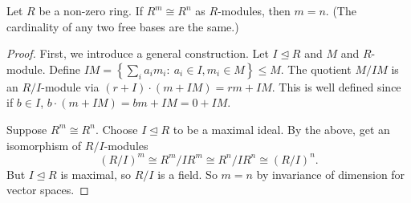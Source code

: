 \documentclass[egregdoesnotlikesansseriftitles,a4paper]{scrartcl}
\begin{document}
\begin{proposition}
        Let $R$ be a non-zero ring. If $R^{m} \cong R^{n}$ as $R$-modules, then $m=n$. (The cardinality of any two free bases are the same.)
\end{proposition}
\begin{proof}
        First, we introduce a general construction. Let $I \unlhd R$ and $M$ and $R$-module. Define $IM = \left\{ \sum_{i}^{}a_{i}m_{i}: \ a_i \in I, m_{i}\in M\right\} \leq M$. The quotient $M/IM$ is an $R/I$-module via $(r+I) \cdot (m+IM) = rm +IM$. This is well defined since if $b \in I$, $b \cdot (m+IM)= bm +IM =0+IM$. 

        Suppose $R^{m} \cong R^{n}$. Choose $I \unlhd R$ to be a maximal ideal\footnotemark. By the above, get an isomorphism of $R/I$-modules \[
        \left(R/I\right)^{m} \cong R^{m}/IR^{m} \cong R^{n}/IR^{n} \cong \left(R/I\right)^{n}
        .\] But $I \unlhd R$ is maximal, so $R/I$ is a field. So $m=n$ by invariance of dimension for vector spaces.
\end{proof}
\newpage
\end{document}
